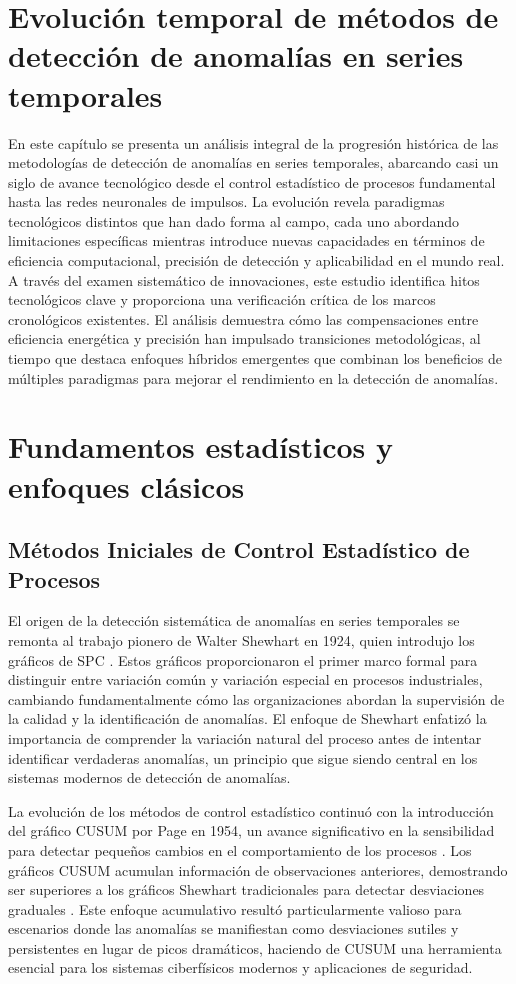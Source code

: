 \section{Evolución temporal de métodos de detección de anomalías en series temporales}
En este capítulo se presenta un análisis integral de la progresión histórica de las metodologías de detección de anomalías en series temporales, abarcando casi un siglo de avance tecnológico desde el control estadístico de procesos fundamental hasta las redes neuronales de impulsos. La evolución revela paradigmas tecnológicos distintos que han dado forma al campo, cada uno abordando limitaciones específicas mientras introduce nuevas capacidades en términos de eficiencia computacional, precisión de detección y aplicabilidad en el mundo real. A través del examen sistemático de innovaciones, este estudio identifica hitos tecnológicos clave y proporciona una verificación crítica de los marcos cronológicos existentes. El análisis demuestra cómo las compensaciones entre eficiencia energética y precisión han impulsado transiciones metodológicas, al tiempo que destaca enfoques híbridos emergentes que combinan los beneficios de múltiples paradigmas para mejorar el rendimiento en la detección de anomalías.

\section{Fundamentos estadísticos y enfoques clásicos}
\subsection{Métodos Iniciales de Control Estadístico de Procesos}

El origen de la detección sistemática de anomalías en series temporales se remonta al trabajo pionero de Walter Shewhart en 1924, quien introdujo los gráficos de SPC \cite{shewhart_economic_1931}. Estos gráficos proporcionaron el primer marco formal para distinguir entre variación común y variación especial en procesos industriales, cambiando fundamentalmente cómo las organizaciones abordan la supervisión de la calidad y la identificación de anomalías. El enfoque de Shewhart enfatizó la importancia de comprender la variación natural del proceso antes de intentar identificar verdaderas anomalías, un principio que sigue siendo central en los sistemas modernos de detección de anomalías.

La evolución de los métodos de control estadístico continuó con la introducción del gráfico CUSUM por Page en 1954, un avance significativo en la sensibilidad para detectar pequeños cambios en el comportamiento de los procesos \cite{page_continuous_1954}. Los gráficos CUSUM acumulan información de observaciones anteriores, demostrando ser superiores a los gráficos Shewhart tradicionales para detectar desviaciones graduales \cite{gualandi_worst-case_2023,gualandi_optimization-based_2022}. Este enfoque acumulativo resultó particularmente valioso para escenarios donde las anomalías se manifiestan como desviaciones sutiles y persistentes en lugar de picos dramáticos, haciendo de CUSUM una herramienta esencial para los sistemas ciberfísicos modernos y aplicaciones de seguridad.


